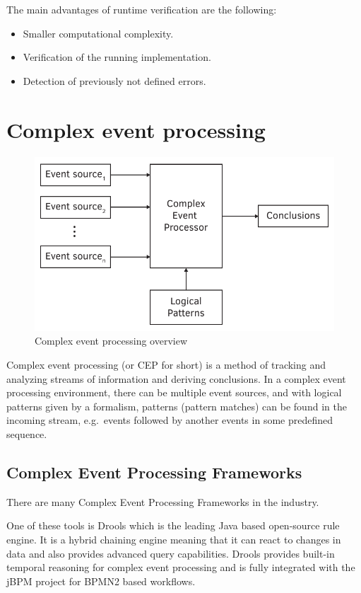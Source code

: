 The main advantages of runtime verification are the following:

\begin{itemize}
	\item Smaller computational complexity.
	\item Verification of the running implementation.
	\item Detection of previously not defined errors.
\end{itemize}

\section{Complex event processing}

\begin{figure}[h]
	\centering
	\includegraphics[width=0.6\linewidth]{figures/chapter_2/CEP}
	\caption{Complex event processing overview}
	\label{fig:intro:cep}
\end{figure}

Complex event processing (or CEP for short) is a method of tracking and analyzing streams of information and deriving conclusions. In a complex event processing environment, there can be multiple event sources, and with logical patterns given by a formalism, patterns (pattern matches) can be found in the incoming stream, e.g.~events followed by another events in some predefined sequence.

\subsection{Complex Event Processing Frameworks}
There are many Complex Event Processing Frameworks in the industry.

One of these tools is Drools\citep{drools} which is the leading Java based open-source rule engine. It is a hybrid chaining engine meaning that it can react to changes in data and also provides advanced query capabilities. Drools provides built-in temporal reasoning for complex event processing and is fully integrated with the jBPM project for BPMN2 based workflows.

